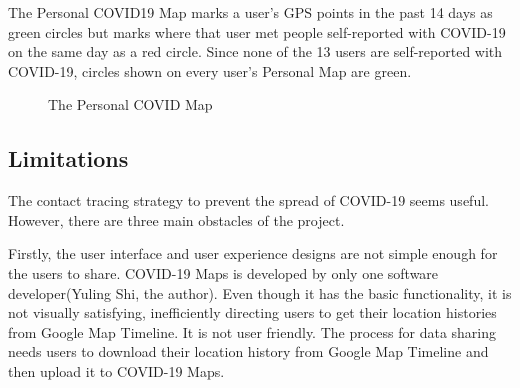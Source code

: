 \documentclass{ucsdreport}
\begin{document}
The Personal COVID19 Map marks a user's GPS points in the past 14 days as green 
circles but marks where that user met people self-reported with COVID-19 on the
same day as a red circle. Since none of the 13 users are self-reported with 
COVID-19, circles shown on every user's Personal Map are green. 

\begin{figure}[H]
    \centering
    \caption{The Personal COVID Map}
\end{figure}


\subsection{Limitations}
The contact tracing strategy to prevent the spread of COVID-19 seems useful. 
However, there are three main obstacles of the project.

Firstly, the user interface and user experience designs are not simple enough 
for the users to share. COVID-19 Maps is developed by only one software 
developer(Yuling Shi, the author). Even though it has the basic functionality, 
it is not visually 
satisfying, inefficiently directing users to get their location histories 
from Google Map Timeline. It is not user friendly. The process for data sharing
needs users to download their location history from Google Map Timeline and 
then upload it to COVID-19 Maps. 
\end{document}
